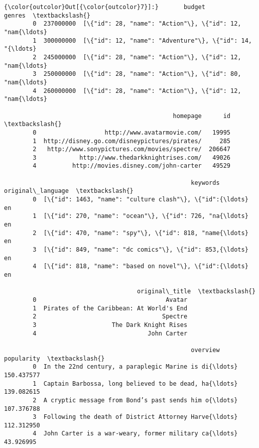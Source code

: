 \documentclass[11pt]{article}
\begin{document}
\begin{Verbatim}[commandchars=\\\{\}]
{\color{outcolor}Out[{\color{outcolor}7}]:}       budget                                             genres  \textbackslash{}
        0  237000000  [\{"id": 28, "name": "Action"\}, \{"id": 12, "nam{\ldots}   
        1  300000000  [\{"id": 12, "name": "Adventure"\}, \{"id": 14, "{\ldots}   
        2  245000000  [\{"id": 28, "name": "Action"\}, \{"id": 12, "nam{\ldots}   
        3  250000000  [\{"id": 28, "name": "Action"\}, \{"id": 80, "nam{\ldots}   
        4  260000000  [\{"id": 28, "name": "Action"\}, \{"id": 12, "nam{\ldots}   
        
                                               homepage      id  \textbackslash{}
        0                   http://www.avatarmovie.com/   19995   
        1  http://disney.go.com/disneypictures/pirates/     285   
        2   http://www.sonypictures.com/movies/spectre/  206647   
        3            http://www.thedarkknightrises.com/   49026   
        4          http://movies.disney.com/john-carter   49529   
        
                                                    keywords original\_language  \textbackslash{}
        0  [\{"id": 1463, "name": "culture clash"\}, \{"id":{\ldots}                en   
        1  [\{"id": 270, "name": "ocean"\}, \{"id": 726, "na{\ldots}                en   
        2  [\{"id": 470, "name": "spy"\}, \{"id": 818, "name{\ldots}                en   
        3  [\{"id": 849, "name": "dc comics"\}, \{"id": 853,{\ldots}                en   
        4  [\{"id": 818, "name": "based on novel"\}, \{"id":{\ldots}                en   
        
                                     original\_title  \textbackslash{}
        0                                    Avatar   
        1  Pirates of the Caribbean: At World's End   
        2                                   Spectre   
        3                     The Dark Knight Rises   
        4                               John Carter   
        
                                                    overview  popularity  \textbackslash{}
        0  In the 22nd century, a paraplegic Marine is di{\ldots}  150.437577   
        1  Captain Barbossa, long believed to be dead, ha{\ldots}  139.082615   
        2  A cryptic message from Bond’s past sends him o{\ldots}  107.376788   
        3  Following the death of District Attorney Harve{\ldots}  112.312950   
        4  John Carter is a war-weary, former military ca{\ldots}   43.926995   
        

\end{Verbatim}
\end{document}
